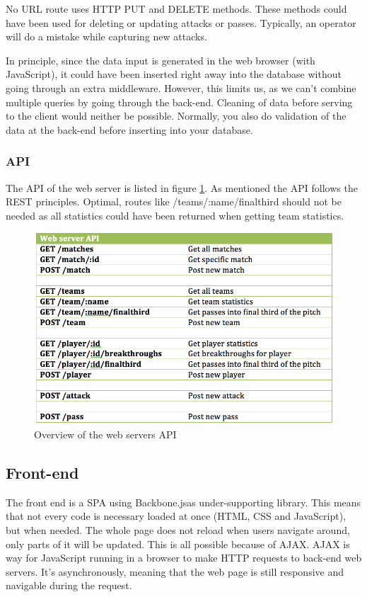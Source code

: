 No URL route uses \ac{HTTP} PUT and DELETE methods. These methods could have been used for deleting or updating attacks or passes. Typically, an operator will do a mistake while capturing new attacks. 

In principle, since the data input is generated in the web browser (with JavaScript), it could have been inserted right away into the database without going through an extra middleware. However, this limits us, as we can’t combine multiple queries by going through the back-end. Cleaning of data before serving to the client would neither be possible. Normally, you also do validation of the data at the back-end before inserting into your database.

\subsubsection{API}

The \ac{API} of the web server is listed in figure \ref{fig:api}. As mentioned the \ac{API} follows the \ac{REST} principles. Optimal, routes like /teams/:name/finalthird should not be needed as all statistics could have been returned when getting team statistics. 

\begin{figure}[ht!]
\centering
\includegraphics[width=1\textwidth]{images/implementation/API.png}
\caption{Overview of the web servers API}
\label{fig:api}
\end{figure}

\subsection{Front-end}

The front end is a \ac{SPA} \cite{} using Backbone.js\footnotemark as under-supporting library. This means that not every code is necessary loaded at once (\ac{HTML}, \ac{CSS} and JavaScript), but when needed. The whole page does not reload when users navigate around, only parts of it will be updated. This is all possible because of \ac{AJAX}. \ac{AJAX} is way for JavaScript running in a browser to make HTTP requests to back-end web servers. It’s asynchronously, meaning that the web page is still responsive and navigable during the request.\cite{ajax}

